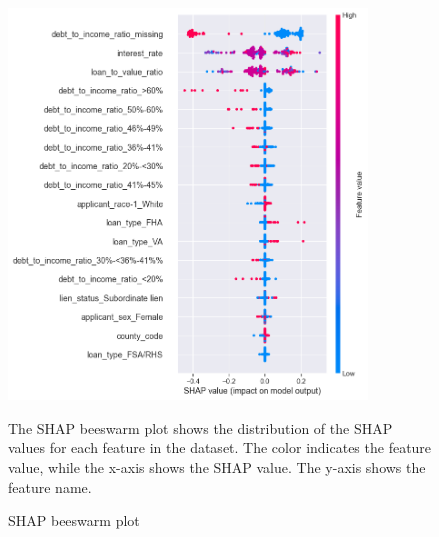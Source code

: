 \begin{figure}[!htbp]
    \centering
    \includegraphics[width=0.85\textwidth]{images/SHAP_Individual_Analyses/beeswarm.png}
    \caption{SHAP beeswarm plot}
    \medskip
    \small
    The SHAP beeswarm plot shows the distribution of the SHAP values for each feature in the dataset. The color indicates the feature value, while the x-axis shows the SHAP value. The y-axis shows the feature name.
    \label{fig:SHAP_beeswarm}
\end{figure}

